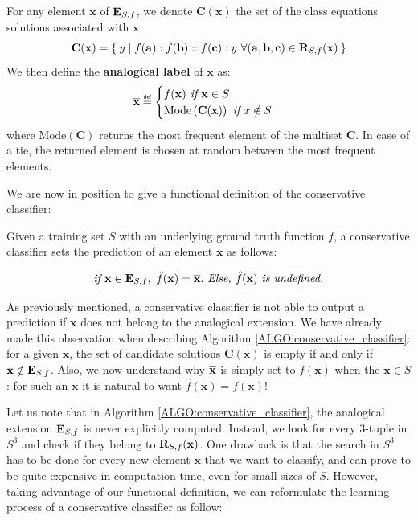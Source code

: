 \begin{definition}
  \label{DEF:analogical_label}
  For any element $\mathbf{x}$ of $\mathbf{E}_{S,f}$, we denote $\mathbf{C}(\mathbf{x})$
  the set of the class equations solutions associated with $\mathbf{x}$:
  $$\mathbf{C}(\mathbf{x}) = \Set{y | f(\mathbf{a}) : f(\mathbf{b}) ::
  f(\mathbf{c}) :y~ \forall (\mathbf{a}, \mathbf{b}, \mathbf{c}) \in \mathbf{R}_{S,f}(\mathbf{x})}$$
  We then define the \textbf{analogical
  label} of $\mathbf{x}$ as:
  $$\albl{\mathbf{x}} \eqdef
  \begin{cases}
    f(\mathbf{x}) \emph{ if } \mathbf{x} \in S\\
    \text{Mode} \left(\mathbf{C}(\mathbf{x})\right) \emph{ if
    } x \notin S
  \end{cases}
  $$
  where $\text{Mode}(\mathbf{C})$ returns the most frequent element of the multiset
$\mathbf{C}$. In case of a tie, the returned element is chosen at random between
the most frequent elements.
\end{definition}

We are now in position to give a functional definition of the conservative
classifier:

\begin{definition}
  \label{DEF:conservative_classifier}
  Given a training set $S$ with an underlying ground truth function $f$,
  a conservative classifier sets the prediction of an element $\mathbf{x}$ as
  follows:

  $$\emph{if } \mathbf{x} \in \mathbf{E}_{S,f}, ~ \hat{f}(\mathbf{x}) = \overline{\mathbf{x}}.
  \emph{ Else, } \hat{f}(\mathbf{x}) \emph{ is undefined.}$$
\end{definition}

As previously mentioned, a conservative classifier is not able to output a
prediction if $\mathbf{x}$ does not belong to the analogical extension. We have
already made this observation when describing Algorithm
\ref{ALGO:conservative_classifier}: for a given $\mathbf{x}$, the set of
candidate solutions $\mathbf{C}(\mathbf{x})$ is empty if and only if $\mathbf{x} \notin \mathbf{E}_{S,f}$.
Also, we now understand why $\overline{\mathbf{x}}$ is simply set to
$f(\mathbf{x})$ when the $\mathbf{x} \in S$: for such an $\mathbf{x}$ it is
natural to want $\hat{f}(\mathbf{x}) = f(\mathbf{x})$!

Let us note that in Algorithm \ref{ALGO:conservative_classifier}, the
analogical extension $\mathbf{E}_{S,f}$ is never explicitly computed. Instead, we look for
every 3-tuple in $S^3$ and check if they belong to $\mathbf{R}_{S,f}(\mathbf{x})$. One drawback is
that the search in $S^3$ has to be done for every new element $\mathbf{x}$ that
we want to classify, and can prove to be quite expensive in computation time,
even for small sizes of $S$. However, taking advantage of our functional
definition, we can reformulate the learning process of a conservative
classifier as follow:

